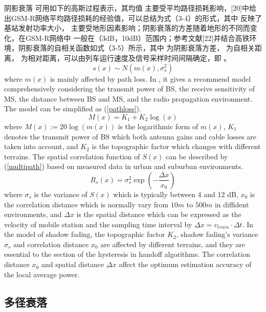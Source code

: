 阴影衰落 可用如下的高斯过程表示，其均值 主要受平均路径损耗影响，[20]中给出GSM-R网络平均路径损耗的经验值，可以总结为式（3-4）的形式，其中 反映了基站发射功率大小， 主要受地形因素影响；阴影衰落的方差随着地形的不同而变化，在GSM-R网络中 一般在（3dB，10dB）范围内；参考文献[22]并结合高铁环境，阴影衰落的自相关函数如式（3-5）所示，其中 为阴影衰落方差， 为自相关距离， 为相对距离，可以由列车运行速度及信号采样时间间隔确定，即 。
\begin{equation}
    s(x) \sim N\left( m(x),\sigma_s^2 \right)
\label{shadow}
\end{equation}
where $m(x)$ is mainly affected by path loss. In \cite{sarkar2003survey}, it gives a recommend model comprehensively considering the transmit power of BS, the receive sensitivity of MS, the distance between BS and MS, and the radio propagation environment. The model can be simplified as (\ref{pathloss}).
\begin{equation}
    M(x)= K_1+K_2\log(x)
\label{pathloss}
\end{equation}
where $M(x):=20\log(m(x))$ is the logarithmic form of $m(x)$, $K_1$ denotes the transmit power of BS which both antenna gains and cable losses are taken into account, and $K_2$ is the topographic factor which changes with different terrains\cite{hata1980empirical}\cite{medeisis2000use}. The spatial correlation function of $S(x)$ can be described by (\ref{multipath}) based on measured data in urban and suburban environments\cite{gudmundson1991correlation}.
\begin{equation}
    R_{s}(x) = \sigma_{s}^2\exp\left(-\frac{\Delta x}{x_0}\right)
\label{multipath}
\end{equation}
where $\sigma_s$ is the variance of $S(x)$ which is typically between 4 and 12 dB, $x_0$ is the correlation distance which is normally vary from $10 m$ to $500 m$ in diffident environments\cite{tepedelenlio?lu2001estimation}, and $\Delta x$ is the spatial distance which can be expressed as the velocity of mobile station and the sampling time interval by $\Delta x = v_{train}\cdot\Delta t$. In the model of shadow fading, the topographic factor $K_2$, shadow fading's variance $\sigma_s$ and correlation distance $x_0$ are affected by different terrains, and they are essential to the section of the hysteresis in handoff algorithms. The correlation distance $x_0$ and spatial distance $\Delta x$ affect the optimum estimation accuracy of the local average power.

\subsection{多径衰落}
\label{sec:multipath}

